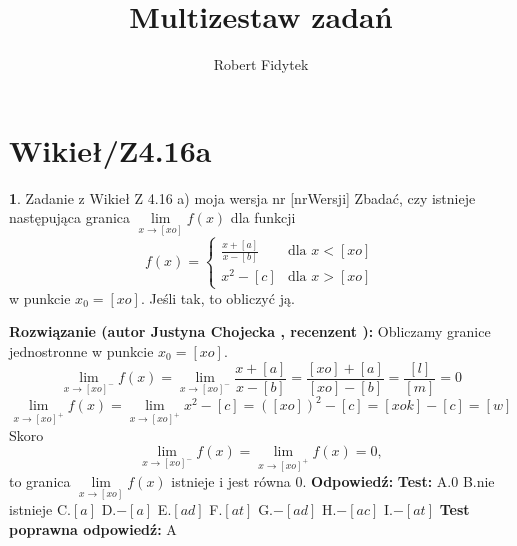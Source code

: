 \documentclass[12pt, a4paper]{article}
\title{Multizestaw zadań}
\author{Robert Fidytek}
\date{}
\theoremstyle{definition} %
\newtheorem{zad}{}
\newcommand{\kategoria}[1]{\section{#1}} %
\newcommand{\zadStart}[1]{\begin{zad}#1\newline} %
\newcommand{\zadStop}{\end{zad}}   %
\newcommand{\rozwStart}[2]{\noindent \textbf{Rozwiązanie (autor #1 , recenzent #2): }\newline} %
\newcommand{\rozwStop}{\newline}                                            %
\newcommand{\odpStart}{\noindent \textbf{Odpowiedź:}\newline}    %
\newcommand{\odpStop}{\newline}                                             %
\newcommand{\testStart}{\noindent \textbf{Test:}\newline} %
\newcommand{\testStop}{\newline} %
\newcommand{\kluczStart}{\noindent \textbf{Test poprawna odpowiedź:}\newline} %
\newcommand{\kluczStop}{\newline} %
\begin{document}
\maketitle


\kategoria{Wikieł/Z4.16a}
\zadStart{Zadanie z Wikieł Z 4.16 a) moja wersja nr [nrWersji]}
Zbadać, czy istnieje następująca granica $\lim\limits_{x\to [xo]}f(x)$ dla funkcji 
$$
f(x)=\left\{\begin{array}{ll}
\frac{x+[a]}{x-[b]} & \textrm{dla $x<[xo]$}\\
x^{2}-[c] & \textrm{dla $x>[xo]$}
\end{array} \right.
$$
w punkcie $x_{0}=[xo]$. Jeśli tak, to obliczyć ją.
\zadStop
\rozwStart{Justyna Chojecka}{}
Obliczamy granice jednostronne w punkcie $x_{0}=[xo]$.
$$\lim\limits_{x\to [xo]^{-}}f(x)=\lim\limits_{x\to [xo]^{-}}\frac{x+[a]}{x-[b]}=\frac{[xo]+[a]}{[xo]-[b]}=\frac{[l]}{[m]}=0$$
$$\lim\limits_{x\to [xo]^{+}}f(x)=\lim\limits_{x\to [xo]^{+}}x^{2}-[c]=([xo])^{2}-[c]=[xok]-[c]=[w]$$
Skoro 
$$\lim\limits_{x\to [xo]^{-}}f(x)=\lim\limits_{x\to [xo]^{+}}f(x)=0,$$
to granica $\lim\limits_{x\to [xo]}f(x)$ istnieje i jest równa 0.
\rozwStop
\odpStart
0
\odpStop
\testStart
A.0
B.nie istnieje
C.$[a]$
D.$-[a]$
E.$[ad]$
F.$[at]$
G.$-[ad]$
H.$-[ac]$
I.$-[at]$
\testStop
\kluczStart
A
\kluczStop
\end{document}
